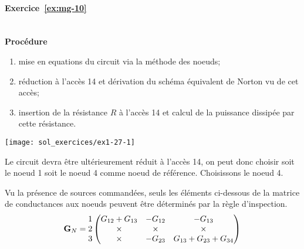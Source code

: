 \paragraph{Exercice~\ref{ex:mg-10}}~\\%
{\bf Procédure} 
\begin{enumerate}
	\item mise en equations du circuit via la méthode des noeuds;
	\item réduction à l'accès 14 et dérivation du schéma équivalent de
	Norton vu de cet accès;
	\item insertion de la résistance $R$ à l'accès 14 et calcul de la
	puissance dissipée par cette résistance.
\end{enumerate}


\begin{center}
	\texttt{[image: sol\_exercices/ex1-27-1]}
\end{center}
Le circuit devra être ultérieurement réduit à l'accès 14, on peut
donc choisir soit le noeud 1 soit le noeud 4 comme noeud de
référence. Choisissons le noeud 4.

Vu la présence de sources commandées, seuls les éléments ci-dessous
de  la matrice de conductances aux
noeuds peuvent être  déterminés par la règle d'inspection. 
\[{\bf G}_N=
\begin{matrix}
1\\
2\\
3
\end{matrix}
\begin{pmatrix}
G_{12}+G_{13} & -G_{12} & -G_{13}\\
\times & \times & \times \\
\times & -G_{23} & G_{13}+G_{23}+G_{34}
\end{pmatrix}\]

